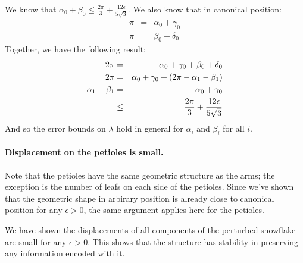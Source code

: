 We know that $\alpha_0 + \beta_0 \leq \frac{2\pi}{3} + \frac{12\epsilon}{5\sqrt{3}}.$
We also know that in canonical position:
$$ 
\begin{array}{rcl}
\pi &=& \alpha_0 + \gamma_0 \\
\pi &=& \beta_0 + \delta_0
\end{array}
$$
Together, we have the following result:
\begin{eqnarray*}
2\pi &=& \alpha_0 + \gamma_0 + \beta_0 + \delta_0\\
2\pi &=& \alpha_0 + \gamma_0 + \left( 2\pi - \alpha_1 - \beta_1 \right)\\
\alpha_1 + \beta_1&=&\alpha_0 + \gamma_0 \\
&\leq& \frac{2\pi}{3} + \frac{12\epsilon}{5\sqrt{3}}\\
\end{eqnarray*}
And so the error bounds on $\lambda$ hold in general for $\alpha_i$ and $\beta_i$ for all $i$.  
\paragraph{Displacement on the petioles is small.}
Note that the petioles have the same geometric structure as the arms; the exception is the number of leafs on each side of the petioles. 
Since we've shown that the geometric shape in arbirary position is already close to canonical position for any $\epsilon>0$, the same argument applies here for the petioles.

We have shown the displacements of all components of the perturbed snowflake are small for any $\epsilon > 0$.  
This shows that the structure has stability in preserving any information encoded with it.











